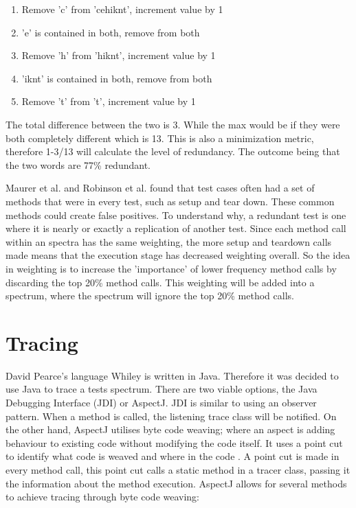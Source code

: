 \begin{enumerate}
\item Remove 'c' from 'cehiknt', increment value by 1
\item 'e' is contained in both, remove from both
\item Remove 'h' from 'hiknt', increment value by 1
\item 'iknt' is contained in both, remove from both
\item Remove 't' from 't', increment value by 1
\end{enumerate}

The total difference between the two is 3. While the max would be if they were both completely different which is 13. This is also a minimization metric, therefore 1-3/13 will calculate the level of redundancy. The outcome being that the two words are 77\% redundant.

Maurer et al. \cite{koochakzadeh2009test} and Robinson et al. \cite{li2008static} found that test cases often had a set of methods that were in every test, such as setup and tear down. These common methods could create false positives. To understand why, a redundant test is one where it is nearly or exactly a replication of another test. Since each method call within an spectra has the same weighting, the more setup and teardown calls made means that the execution stage has decreased weighting overall. So the idea in weighting is to increase the 'importance' of lower frequency method calls by discarding the top 20\% method calls. This weighting will be added into a spectrum, where the spectrum will ignore the top 20\% method calls.

\section{Tracing}
\label{S:trace}

David Pearce's language Whiley is written in Java. Therefore it was decided to use Java to trace a tests spectrum. There are two viable options, the Java Debugging Interface (JDI) or AspectJ. JDI is similar to using an observer pattern. When a method is called, the listening trace class will be notified. On the other hand, AspectJ utilises byte code weaving; where an aspect is adding behaviour to existing code without modifying the code itself. It uses a point cut to identify what code is weaved and where in the code \cite{aspectwiki}. A point cut is made in every method call, this point cut calls a static method in a tracer class, passing it the information about the method execution. AspectJ allows for several methods to achieve tracing through byte code weaving:

